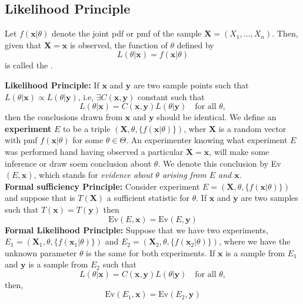 \subsection{Likelihood Principle}
\begin{definition}
    Let $f(\boldsymbol{x}|\theta)$ denote the joint pdf or pmf of the sample $\boldsymbol{X} = (X_1,...,X_n)$. Then, given that $\boldsymbol{X} = \boldsymbol{x}$ is observed, the function of $\theta$ defined by $$
    L(\theta|\boldsymbol{x}) = f(\boldsymbol{x}|\theta)
    $$
    is called the .
\end{definition}
\textbf{Likelihood Principle:} If $\boldsymbol{x}$ and $\boldsymbol{y}$ are two sample points such that $L(\theta|\boldsymbol{x}) \propto L(\theta|\boldsymbol{y})$, i.e, $\exists C(\boldsymbol{x},\boldsymbol{y})$ constant such that
$$
    L(\theta|\boldsymbol{x}) = C(\boldsymbol{x},\boldsymbol{y}) L(\theta|\boldsymbol{y}) \quad \text{for all } \theta,
$$
then the conclusions drawn from $\boldsymbol{x}$ and $\boldsymbol{y}$ should be identical. 
We define an \textbf{experiment} $E$ to be a triple $(\boldsymbol{X}, \theta, \{f(\boldsymbol{x}|\theta)\})$, wher $\boldsymbol{X}$ is a random vector with pmf $f(\boldsymbol{x}|\theta)$ for some $\theta \in \Theta$. An experimenter knowing what experiment $E$ was performed hand having observed a particular $\boldsymbol{X} = \boldsymbol{x}$, will make some inference or draw soem conclusion about $\theta$. We denote this conclusion by Ev$(E,\boldsymbol{x})$, which stands for \textit{evidence about $\theta$ arising from $E$ and $\boldsymbol{x}$}.
\\
\textbf{Formal sufficiency Principle:} Consider experiment $E = (\boldsymbol{X}, \theta,\{f(\boldsymbol{x}|\theta)\})$ and suppose that is $T(\boldsymbol{X})$ a sufficient statistic for $\theta$. If $\boldsymbol{x}$ and $\boldsymbol{y}$ are two samples such that $T(\boldsymbol{x}) = T(\boldsymbol{y})$ then
$$
\text{Ev}(E,\boldsymbol{x}) = \text{Ev}(E,\boldsymbol{y})
$$
\textbf{Formal Likelihood Principle:} Suppose that we have two experiments, $E_1 = (\boldsymbol{X}_1, \theta, \{f(\boldsymbol{x}_1|\theta)\})$ and $E_2 = (\boldsymbol{X}_2, \theta, \{f(\boldsymbol{x}_2|\theta)\})$, where we have the unknown parameter $\theta$ is the same for both experiments. If $\boldsymbol{x}$ is a sample from $E_1$ and $\boldsymbol{y}$ is a sample from $E_2$ such that 
$$
    L(\theta|\boldsymbol{x}) = C(\boldsymbol{x},\boldsymbol{y}) L(\theta|\boldsymbol{y}) \quad \text{for all } \theta,
$$
then,
$$
\text{Ev}(E_1,\boldsymbol{x}) = \text{Ev}(E_2,\boldsymbol{y})
$$